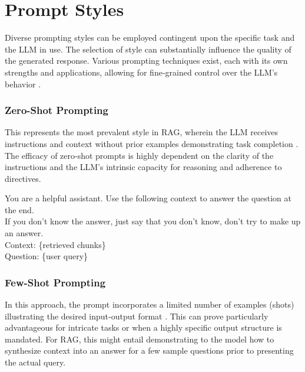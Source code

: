 \section{Prompt Styles}
Diverse prompting styles can be employed contingent upon the specific task and the LLM in use. The selection of style can substantially influence the quality of the generated response. Various prompting techniques exist, each with its own strengths and applications, allowing for fine-grained control over the LLM's behavior \autocite{liu2023geval}.

\subsubsection{Zero-Shot Prompting}
This represents the most prevalent style in RAG, wherein the LLM receives instructions and context without prior examples demonstrating task completion \autocite{brown2020language}. The efficacy of zero-shot prompts is highly dependent on the clarity of the instructions and the LLM's intrinsic capacity for reasoning and adherence to directives.


\begin{tcolorbox}[promptbox,title=Example: Zero-Shot Prompting]
You are a helpful assistant. Use the following context to answer the question at the end.\\
If you don't know the answer, just say that you don't know, don't try to make up an answer.\\

Context: \{retrieved chunks\}\\

Question: \{user query\}
\end{tcolorbox}
    
\subsubsection{Few-Shot Prompting}
In this approach, the prompt incorporates a limited number of examples (shots) illustrating the desired input-output format \autocite{brown2020language}. This can prove particularly advantageous for intricate tasks or when a highly specific output structure is mandated. For RAG, this might entail demonstrating to the model how to synthesize context into an answer for a few sample questions prior to presenting the actual query.

